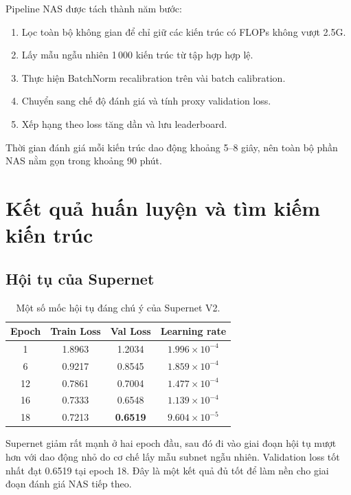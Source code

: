 Pipeline NAS được tách thành năm bước:
\begin{enumerate}
  \item Lọc toàn bộ không gian để chỉ giữ các kiến trúc có FLOPs không vượt 2.5G.
  \item Lấy mẫu ngẫu nhiên 1\,000 kiến trúc từ tập hợp hợp lệ.
  \item Thực hiện BatchNorm recalibration trên vài batch calibration.
  \item Chuyển sang chế độ đánh giá và tính proxy validation loss.
  \item Xếp hạng theo loss tăng dần và lưu leaderboard.
\end{enumerate}

Thời gian đánh giá mỗi kiến trúc dao động khoảng 5--8 giây, nên toàn bộ phần NAS nằm gọn trong khoảng 90 phút.

\chapter{Kết quả huấn luyện và tìm kiếm kiến trúc}

\section{Hội tụ của Supernet}

\begin{table}[H]
\centering
\caption{Một số mốc hội tụ đáng chú ý của Supernet V2.}
\begin{tabular}{@{}cccc@{}}
\toprule
\textbf{Epoch} & \textbf{Train Loss} & \textbf{Val Loss} & \textbf{Learning rate} \\
\midrule
1  & 1.8963 & 1.2034 & \(1.996 \times 10^{-4}\) \\
6  & 0.9217 & 0.8545 & \(1.859 \times 10^{-4}\) \\
12 & 0.7861 & 0.7004 & \(1.477 \times 10^{-4}\) \\
16 & 0.7333 & 0.6548 & \(1.139 \times 10^{-4}\) \\
18 & 0.7213 & \textbf{0.6519} & \(9.604 \times 10^{-5}\) \\
\bottomrule
\end{tabular}
\end{table}

Supernet giảm rất mạnh ở hai epoch đầu, sau đó đi vào giai đoạn hội tụ mượt hơn với dao động nhỏ do cơ chế lấy mẫu subnet ngẫu nhiên. Validation loss tốt nhất đạt 0.6519 tại epoch 18. Đây là một kết quả đủ tốt để làm nền cho giai đoạn đánh giá NAS tiếp theo.

